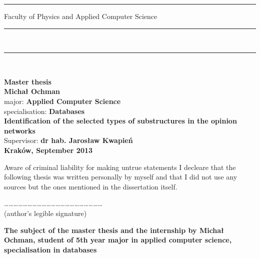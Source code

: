 \rule{26.75mm}{0pt}{
{\large \textsf{Faculty of Physics and Applied Computer Science}}\\
\rule{\textwidth}{3pt}\\
\rule[2ex]
{\textwidth}{1pt}\\
\vspace{7ex}
\begin{center}
{\LARGE \bf \textsf{Master thesis}}\\
\vspace{13ex}
{\bf \Large \textsf{Michał Ochman}}\\
\vspace{3ex}
{\small \sf major: {\bf \textsf{Applied Computer Science}}}\\
\vspace{1.5ex}
{\small \sf specialisation: {\bf \textsf{Databases}}}\\
\vspace{10ex}
{\bf \huge \textsf{Identification of the selected types of substructures in the opinion networks}}\\
\vspace{14ex}
{\Large \sf Supervisor: {\bf \textsf{dr hab. Jarosław Kwapień}}}\\
\vspace{22ex}
{\large \bf \textsf{Kraków, September 2013}}
\end{center}

\newpage
\thispagestyle{empty}
Aware of criminal liability for making untrue statements I decleare that
the following thesis was written personally by myself and that I did not use
any sources but the ones mentioned in the dissertation itself.

\vspace{10ex}
\begin{flushright}
\ldots\ldots\ldots\ldots\ldots\ldots\ldots\ldots\ldots\ldots\ldots\ldots\ldots\ldots\ldots\ldots\ldots\ldots\ldots\ldots\ldots\\
(author's legible signature)
\end{flushright}


\newpage

\begin{center}
{\bf The subject of the master thesis and the internship by Michał Ochman,
student of 5th year major in applied computer science, specialisation in databases}\\
\end{center}

}
